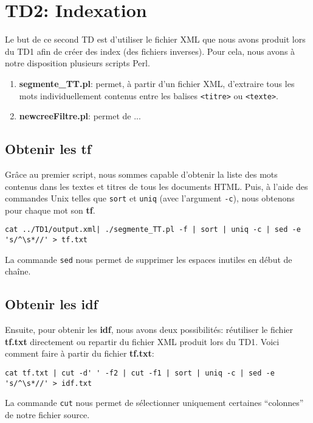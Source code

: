 \chapter{TD2: Indexation}

Le but de ce second TD est d'utiliser le fichier XML que nous avons produit lors du TD1 afin de créer des index (des fichiers inverses). Pour cela, nous avons à notre disposition plusieurs scripts Perl.

\begin{enumerate}
  \item \textbf{segmente\_TT.pl}: permet, à partir d'un fichier XML, d'extraire tous les mots individuellement contenus entre les balises \lstinline{<titre>} ou \lstinline{<texte>}.
  \item \textbf{newcreeFiltre.pl}: permet de ...
\end{enumerate}

\section{Obtenir les tf}

Grâce au premier script, nous sommes capable d'obtenir la liste des mots contenus dans les textes et titres de tous les documents HTML. Puis, à l'aide des commandes Unix telles que \lstinline{sort} et \lstinline{uniq} (avec l'argument \lstinline{-c}), nous obtenons pour chaque mot son \textbf{tf}.

\fakeshell
\begin{lstlisting}
cat ../TD1/output.xml| ./segmente_TT.pl -f | sort | uniq -c | sed -e 's/^\s*//' > tf.txt
\end{lstlisting}

La commande \lstinline{sed} nous permet de supprimer les espaces inutiles en début de chaîne.

\section{Obtenir les idf}

Ensuite, pour obtenir les \textbf{idf}, nous avons deux possibilités: réutiliser le fichier \textbf{tf.txt} directement ou repartir du fichier XML produit lors du TD1. Voici comment faire à partir du fichier \textbf{tf.txt}:

\begin{lstlisting}
cat tf.txt | cut -d' ' -f2 | cut -f1 | sort | uniq -c | sed -e 's/^\s*//' > idf.txt
\end{lstlisting}

La commande \lstinline{cut} nous permet de sélectionner uniquement certaines ``colonnes'' de notre fichier source.
